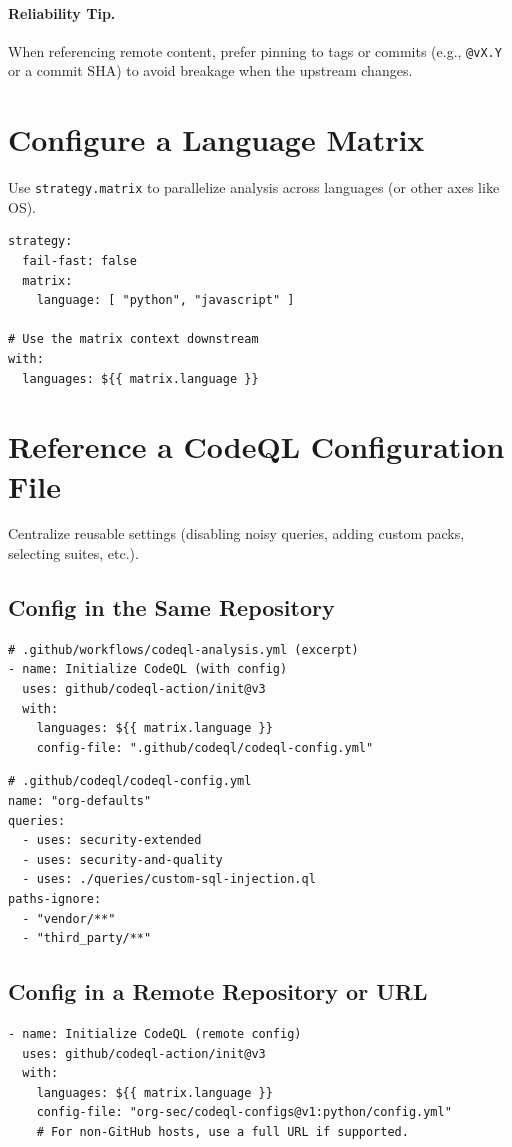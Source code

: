 \documentclass[11pt,a4paper]{article}
\begin{document}
\paragraph{Reliability Tip.} When referencing remote content, prefer pinning to tags or commits (e.g., \texttt{@vX.Y} or a commit SHA) to avoid breakage when the upstream changes.
\clearpage

\section{Configure a Language Matrix}
Use \texttt{strategy.matrix} to parallelize analysis across languages (or other axes like OS).

\begin{verbatim}
strategy:
  fail-fast: false
  matrix:
    language: [ "python", "javascript" ]

# Use the matrix context downstream
with:
  languages: ${{ matrix.language }}
\end{verbatim}

\section{Reference a CodeQL Configuration File}
Centralize reusable settings (disabling noisy queries, adding custom packs, selecting suites, etc.).

\subsection*{Config in the Same Repository}
\begin{verbatim}
# .github/workflows/codeql-analysis.yml (excerpt)
- name: Initialize CodeQL (with config)
  uses: github/codeql-action/init@v3
  with:
    languages: ${{ matrix.language }}
    config-file: ".github/codeql/codeql-config.yml"
\end{verbatim}

\begin{verbatim}
# .github/codeql/codeql-config.yml
name: "org-defaults"
queries:
  - uses: security-extended
  - uses: security-and-quality
  - uses: ./queries/custom-sql-injection.ql
paths-ignore:
  - "vendor/**"
  - "third_party/**"
\end{verbatim}

\subsection*{Config in a Remote Repository or URL}
\begin{verbatim}
- name: Initialize CodeQL (remote config)
  uses: github/codeql-action/init@v3
  with:
    languages: ${{ matrix.language }}
    config-file: "org-sec/codeql-configs@v1:python/config.yml"
    # For non-GitHub hosts, use a full URL if supported.
\end{verbatim}
\clearpage
\end{document}
